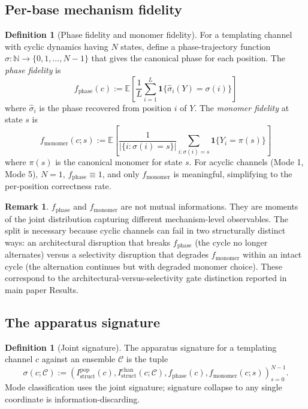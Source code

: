 \documentclass[11pt]{article}
\theoremstyle{plain}
\theoremstyle{definition}
\newtheorem{definition}[theorem]{Definition}
\newtheorem{remark}[theorem]{Remark}
\newcommand{\Istructpop}{I_{\mathrm{struct}}^{\mathrm{pop}}}
\newcommand{\Istructchan}{I_{\mathrm{struct}}^{\mathrm{chan}}}
\newcommand{\fphase}{f_{\mathrm{phase}}}
\newcommand{\fmonomer}{f_{\mathrm{monomer}}}
\begin{document}
\subsection{Per-base mechanism fidelity}

\begin{definition}[Phase fidelity and monomer fidelity]
For a templating channel with cyclic dynamics having $N$ states, define a phase-trajectory function $\sigma : \mathbb{N} \to \{0, 1, \ldots, N-1\}$ that gives the canonical phase for each position. The \emph{phase fidelity} is
\[
\fphase(c) := \mathbb{E}\left[\frac{1}{L} \sum_{i=1}^{L} \mathbf{1}\{\hat{\sigma}_i(Y) = \sigma(i)\}\right]
\]
where $\hat{\sigma}_i$ is the phase recovered from position $i$ of $Y$. The \emph{monomer fidelity} at state $s$ is
\[
\fmonomer(c; s) := \mathbb{E}\left[\frac{1}{|\{i : \sigma(i) = s\}|} \sum_{i: \sigma(i) = s} \mathbf{1}\{Y_i = \pi(s)\}\right]
\]
where $\pi(s)$ is the canonical monomer for state $s$. For acyclic channels (Mode 1, Mode 5), $N = 1$, $\fphase \equiv 1$, and only $\fmonomer$ is meaningful, simplifying to the per-position correctness rate.
\end{definition}

\begin{remark}
$\fphase$ and $\fmonomer$ are not mutual informations. They are moments of the joint distribution capturing different mechanism-level observables. The split is necessary because cyclic channels can fail in two structurally distinct ways: an architectural disruption that breaks $\fphase$ (the cycle no longer alternates) versus a selectivity disruption that degrades $\fmonomer$ within an intact cycle (the alternation continues but with degraded monomer choice). These correspond to the architectural-versus-selectivity gate distinction reported in main paper Results.
\end{remark}

\subsection{The apparatus signature}

\begin{definition}[Joint signature]
The apparatus signature for a templating channel $c$ against an ensemble $\mathcal{C}$ is the tuple
\[
\sigma(c; \mathcal{C}) := \left(\Istructpop(c), \Istructchan(c; \mathcal{C}), \fphase(c), \fmonomer(c; s)\right)_{s = 0}^{N-1}.
\]
Mode classification uses the joint signature; signature collapse to any single coordinate is information-discarding.
\end{definition}
\end{document}
